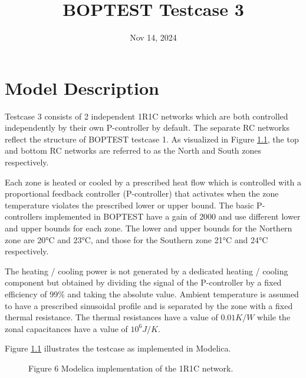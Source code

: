 \documentclass[letterpaper,10pt,english]{sphinxmanual}
\title{BOPTEST Testcase 3}
\date{Nov 14, 2024}
\author{}
\begin{document}
\pagestyle{empty}
\maketitle
\pagestyle{plain}
\sphinxtableofcontents
\pagestyle{normal}
\label{\detokenize{index::doc}}



\chapter{Model Description}
\label{\detokenize{modelDescription:model-description}}\label{\detokenize{modelDescription::doc}}

Testcase 3 consists of 2 independent 1R1C networks which are both controlled independently by their own P-controller by default. The separate RC networks reflect the structure of BOPTEST testcase 1. As visualized in Figure \ref{\detokenize{modelicaWhole}}, the top and bottom RC networks are referred to as the North and South zones respectively.

Each zone is heated or cooled by a prescribed heat flow which is controlled with a proportional feedback controller (P-controller) that activates when the zone temperature violates the prescribed lower or upper bound. The basic P-controllers implemented in BOPTEST have a gain of $2000$ and use different lower and upper bounds for each zone. The lower and upper bounds for the Northern zone are 20°C and 23°C, and those for the Southern zone 21°C and 24°C respectively.

The heating / cooling power is not generated by a dedicated heating / cooling component but obtained by dividing the signal of the P-controller by a fixed efficiency of 99\% and taking the absolute value. Ambient temperature is assumed to have a prescribed sinusoidal profile and is separated by the zone with a fixed thermal resistance. The thermal resistances have a value of $0.01 K/W$ while the zonal capacitances have a value of $10^6 J/K$.

Figure \ref{\detokenize{modelicaWhole}} illustrates the testcase as implemented in Modelica.

\begin{figure}[htbp]
\centering
\capstart
\noindent{}
\caption{Figure 6 \textendash{} Modelica implementation of the 1R1C network.}\label{\detokenize{modelicaWhole}}\end{figure}


\renewcommand{\indexname}{Index}
\printindex
\end{document}
